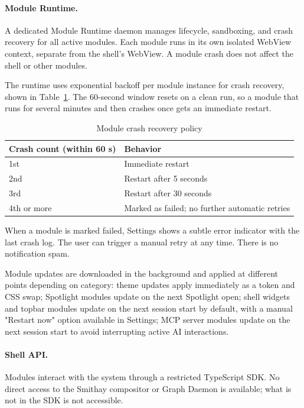 \paragraph{Module Runtime.}
A dedicated Module Runtime daemon manages lifecycle, sandboxing, and crash
recovery for all active modules. Each module runs in its own isolated WebView
context, separate from the shell's WebView. A module crash does not affect the
shell or other modules.

The runtime uses exponential backoff per module instance for crash recovery,
shown in Table~\ref{tab:crash-recovery}. The 60-second window resets on a
clean run, so a module that runs for several minutes and then crashes once
gets an immediate restart.

\begin{table}[htbp]
\caption{Module crash recovery policy}
\label{tab:crash-recovery}
\begin{tabularx}{\linewidth}{lX}
\toprule
\textbf{Crash count (within 60 s)} & \textbf{Behavior} \\
\midrule
1st & Immediate restart \\
2nd & Restart after 5 seconds \\
3rd & Restart after 30 seconds \\
4th or more & Marked as failed; no further automatic retries \\
\bottomrule
\end{tabularx}
\end{table}

When a module is marked failed, Settings shows a subtle error indicator with
the last crash log. The user can trigger a manual retry at any time. There is
no notification spam.

Module updates are downloaded in the background and applied at different points
depending on category: theme updates apply immediately as a token and CSS swap;
Spotlight modules update on the next Spotlight open; shell widgets and topbar
modules update on the next session start by default, with a manual
"Restart now" option available in Settings; MCP server modules update on the
next session start to avoid interrupting active AI interactions.

\paragraph{Shell API.}
Modules interact with the system through a restricted TypeScript SDK. No direct
access to the Smithay compositor or Graph Daemon is available; what is not in
the SDK is not accessible.

